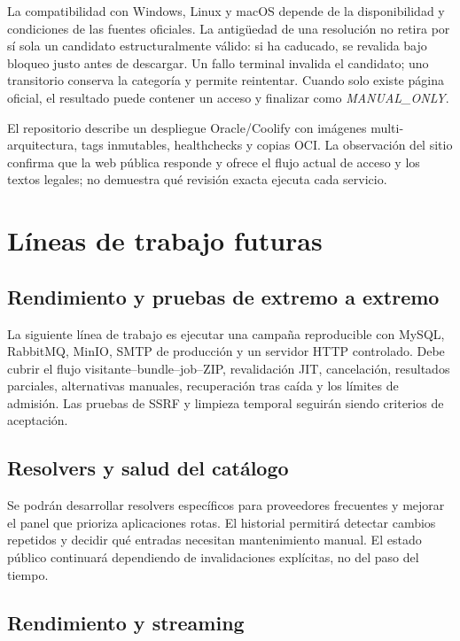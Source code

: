 La compatibilidad con Windows, Linux y macOS depende de la disponibilidad y condiciones de las fuentes oficiales. La antigüedad de una resolución no retira por sí sola un candidato estructuralmente válido: si ha caducado, se revalida bajo bloqueo justo antes de descargar. Un fallo terminal invalida el candidato; uno transitorio conserva la categoría y permite reintentar. Cuando solo existe página oficial, el resultado puede contener un acceso  y finalizar como \emph{MANUAL\_ONLY}.

El repositorio describe un despliegue Oracle/Coolify con imágenes multi-arquitectura, tags inmutables, healthchecks y copias OCI. La observación del sitio confirma que la web pública responde y ofrece el flujo actual de acceso y los textos legales; no demuestra qué revisión exacta ejecuta cada servicio.

\section{Líneas de trabajo futuras}

\subsection{Rendimiento y pruebas de extremo a extremo}

La siguiente línea de trabajo es ejecutar una campaña reproducible con MySQL, RabbitMQ, MinIO, SMTP de producción y un servidor HTTP controlado. Debe cubrir el flujo visitante--bundle--job--ZIP, revalidación JIT, cancelación, resultados parciales, alternativas manuales, recuperación tras caída y los límites de admisión. Las pruebas de SSRF y limpieza temporal seguirán siendo criterios de aceptación.

\subsection{Resolvers y salud del catálogo}

Se podrán desarrollar resolvers específicos para proveedores frecuentes y mejorar el panel que prioriza aplicaciones rotas. El historial permitirá detectar cambios repetidos y decidir qué entradas necesitan mantenimiento manual. El estado público continuará dependiendo de invalidaciones explícitas, no del paso del tiempo.

\subsection{Rendimiento y streaming}

